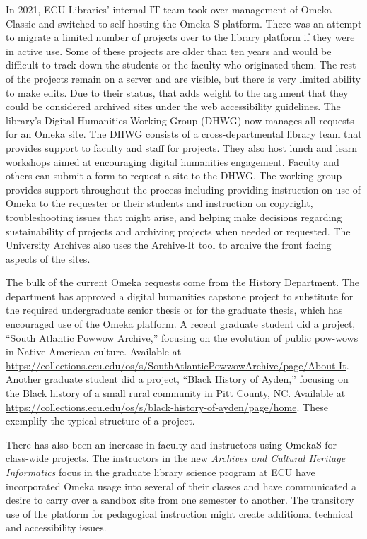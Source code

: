\documentclass[final]{anthology-ch}
\begin{document}
In 2021, ECU Libraries' internal IT team took over management of Omeka Classic and switched to self-hosting the Omeka S platform. There was an attempt to migrate a limited number of projects over to the library platform if they were in active use. Some of these projects are older than ten years and would be difficult to track down the students or the faculty who originated them. The rest of the projects remain on a server and are visible, but there is very limited ability to make edits. Due to their status, that adds weight to the argument that they could be considered archived sites under the web accessibility guidelines. The library's Digital Humanities Working Group (DHWG) now manages all requests for an Omeka site. The DHWG consists of a cross-departmental library team that provides support to faculty and staff for projects. They also host lunch and learn workshops aimed at encouraging digital humanities engagement. Faculty and others can submit a form to request a site to the DHWG. The working group provides support throughout the process including providing instruction on use of Omeka to the requester or their students and instruction on copyright, troubleshooting issues that might arise, and helping make decisions regarding sustainability of projects and archiving projects when needed or requested. The University Archives also uses the Archive-It tool to archive the front facing aspects of the sites.

The bulk of the current Omeka requests come from the History Department. The department has approved a digital humanities capstone project to substitute for the required undergraduate senior thesis or for the graduate thesis, which has encouraged use of the Omeka platform. A recent graduate student did a project, \enquote{South Atlantic Powwow Archive,} focusing on the evolution of public pow-wows in Native American culture. Available at \url{https://collections.ecu.edu/os/s/SouthAtlanticPowwowArchive/page/About-It}. Another graduate student did a project, \enquote{Black History of Ayden,} focusing on the Black history of a small rural community in Pitt County, NC. Available at \url{https://collections.ecu.edu/os/s/black-history-of-ayden/page/home}. These exemplify the typical structure of a project.

There has also been an increase in faculty and instructors using OmekaS for class-wide projects. The instructors in the new \textit{Archives and Cultural Heritage Informatics} focus in the graduate library science program at ECU have incorporated Omeka usage into several of their classes and have communicated a desire to carry over a sandbox site from one semester to another. The transitory use of the platform for pedagogical instruction might create additional technical and accessibility issues.
\end{document}
